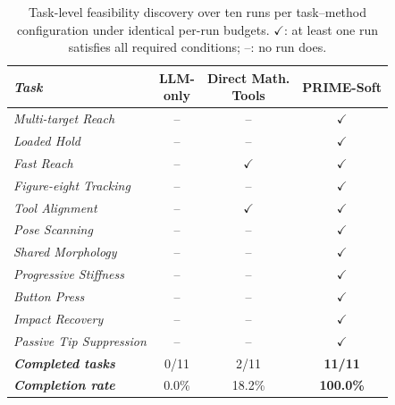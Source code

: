 \begin{table}[!htbp]
\centering
\caption{Task-level feasibility discovery over ten runs per task--method configuration under identical per-run budgets. $\checkmark$: at least one run satisfies all required conditions; --: no run does.}
\label{tab:abc-comparison}
\papertablestyle
\begin{tabular*}{\columnwidth}{@{\extracolsep{\fill}}>{\itshape}lccc@{}}
\toprule
\normalfont\textbf{Task} & \shortstack{\textbf{LLM-}\\\textbf{only}} & \shortstack{\textbf{Direct Math.}\\\textbf{Tools}} & \textbf{PRIME-Soft} \\
\midrule
Multi-target Reach & -- & -- & $\checkmark$ \\
Loaded Hold & -- & -- & $\checkmark$ \\
Fast Reach & -- & $\checkmark$ & $\checkmark$ \\
Figure-eight Tracking & -- & -- & $\checkmark$ \\
Tool Alignment & -- & $\checkmark$ & $\checkmark$ \\
Pose Scanning & -- & -- & $\checkmark$ \\
Shared Morphology & -- & -- & $\checkmark$ \\
Progressive Stiffness & -- & -- & $\checkmark$ \\
Button Press & -- & -- & $\checkmark$ \\
Impact Recovery & -- & -- & $\checkmark$ \\
Passive Tip Suppression & -- & -- & $\checkmark$ \\
\midrule
\normalfont\textbf{Completed tasks} & 0/11 & 2/11 & \textbf{11/11} \\
\normalfont\textbf{Completion rate} & 0.0\% & 18.2\% & \textbf{100.0\%} \\
\bottomrule
\end{tabular*}
\end{table}
